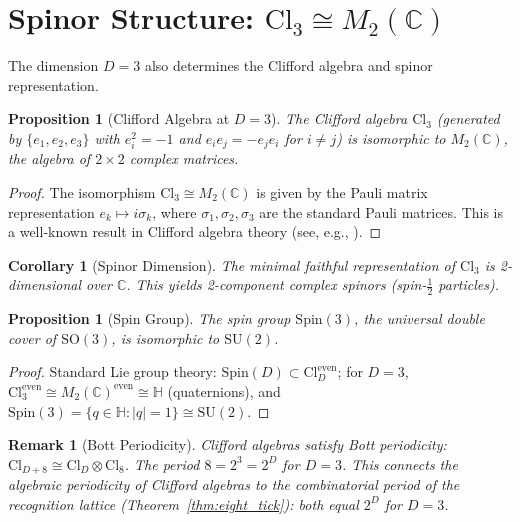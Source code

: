 \documentclass[11pt]{article}
\newtheorem{proposition}[theorem]{Proposition}
\newtheorem{corollary}[theorem]{Corollary}
\newtheorem{remark}[theorem]{Remark}
\newcommand{\Cl}{\mathrm{Cl}}
\newcommand{\Spin}{\mathrm{Spin}}
\newcommand{\SU}{\mathrm{SU}}
\newcommand{\SO}{\mathrm{SO}}
\begin{document}
\section{Spinor Structure: $\Cl_3 \cong M_2(\mathbb{C})$}
\label{sec:spinor}

The dimension $D = 3$ also determines the Clifford algebra and spinor representation.

\begin{proposition}[Clifford Algebra at $D = 3$]\label{prop:clifford}
The Clifford algebra $\Cl_3$ (generated by $\{e_1, e_2, e_3\}$ with $e_i^2 = -1$ and $e_i e_j = -e_j e_i$ for $i \neq j$) is isomorphic to $M_2(\mathbb{C})$, the algebra of $2 \times 2$ complex matrices.
\end{proposition}

\begin{proof}
The isomorphism $\Cl_3 \cong M_2(\mathbb{C})$ is given by the Pauli matrix representation $e_k \mapsto i\sigma_k$, where $\sigma_1, \sigma_2, \sigma_3$ are the standard Pauli matrices.
This is a well-known result in Clifford algebra theory (see, e.g., \cite{Lawson1989}).
\end{proof}

\begin{corollary}[Spinor Dimension]\label{cor:spinor}
The minimal faithful representation of $\Cl_3$ is 2-dimensional over $\mathbb{C}$.
This yields 2-component complex spinors (spin-$\frac{1}{2}$ particles).
\end{corollary}

\begin{proposition}[Spin Group]\label{prop:spin_group}
The spin group $\Spin(3)$, the universal double cover of $\SO(3)$, is isomorphic to $\SU(2)$.
\end{proposition}

\begin{proof}
Standard Lie group theory: $\Spin(D) \subset \Cl_D^{\mathrm{even}}$; for $D = 3$, $\Cl_3^{\mathrm{even}} \cong M_2(\mathbb{C})^{\mathrm{even}} \cong \mathbb{H}$ (quaternions), and $\Spin(3) = \{q \in \mathbb{H} : |q| = 1\} \cong \SU(2)$.
\end{proof}

\begin{remark}[Bott Periodicity]\label{rem:bott}
Clifford algebras satisfy Bott periodicity: $\Cl_{D+8} \cong \Cl_D \otimes \Cl_8$.
The period $8 = 2^3 = 2^D$ for $D = 3$.
This connects the algebraic periodicity of Clifford algebras to the combinatorial period of the recognition lattice (Theorem~\ref{thm:eight_tick}): both equal $2^D$ for $D = 3$.
\end{remark}
\end{document}

